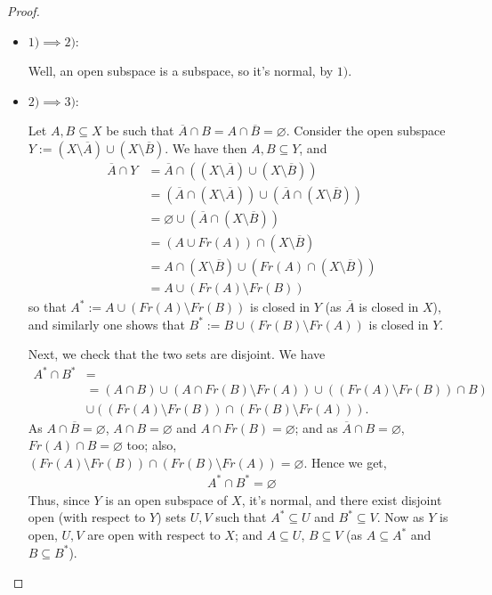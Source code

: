 \documentclass[12pt]{extarticle}
\newcommand{\<}{\langle}
\renewcommand{\>}{\rangle}
\renewcommand{\emptyset}{\varnothing}
\theoremstyle{definition}
\begin{document}
\begin{proof}
  \begin{itemize}
  \item $1) \implies 2)$:

    Well, an open subspace is a subspace, so it's normal, by $1)$.
  \item $2) \implies 3)$:

    Let $A, B \subseteq X$ be such that $\overline{A} \cap B = A \cap \overline{B} = \emptyset$. Consider the open subspace $Y := (X \setminus \overline{A}) \cup (X \setminus \overline{B})$. We have then $A,B \subseteq Y$, and
    \begin{align*}
      \overline{A} \cap Y &= \overline{A} \cap ((X \setminus \overline{A}) \cup (X \setminus \overline{B})) \\ 
      &= (\overline{A} \cap (X \setminus \overline{A})) \cup (\overline{A} \cap (X \setminus \overline{B})) \\
      &= \emptyset \cup (\overline{A} \cap (X \setminus \overline{B})) \\
      &= (A \cup Fr(A)) \cap (X \setminus \overline{B}) \\
      &= A \cap (X \setminus \overline{B}) \cup (Fr(A) \cap (X \setminus \overline{B})) \\
      &= A \cup (Fr(A) \setminus Fr(B))
    \end{align*}
    so that $A^{*} := A \cup (Fr(A) \setminus Fr(B))$ is closed in $Y$ (as $\overline{A}$ is closed in $X$), and similarly one shows that $B^{*} := B \cup (Fr(B) \setminus Fr(A))$ is closed in $Y$.

    Next, we check that the two sets are disjoint. We have
    \begin{align*}
      A^{*} \cap B^{*} &= \\
      &= (A \cap B) \cup (A \cap Fr(B) \setminus Fr(A)) \cup ((Fr(A) \setminus Fr(B)) \cap B) \\
      &\cup ((Fr(A) \setminus Fr(B)) \cap (Fr(B) \setminus Fr(A))).
    \end{align*}
    As $A \cap \overline{B} = \emptyset$, $A \cap B = \emptyset$ and $A \cap Fr(B) = \emptyset$; and as $\overline{A} \cap B = \emptyset$, $Fr(A) \cap B = \emptyset$ too; also,
    $(Fr(A) \setminus Fr(B)) \cap (Fr(B) \setminus Fr(A)) = \emptyset$. Hence we get,
    \begin{align*}
      A^{*} \cap B^{*} = \emptyset
    \end{align*}
    Thus, since $Y$ is an open subspace of $X$, it's normal, and there exist disjoint open (with respect to $Y$) sets $U,V$ such that
    $A^{*} \subseteq U$ and $B^{*} \subseteq V$. Now as $Y$ is open, $U, V$ are open with respect to $X$; and $A \subseteq U$, $B \subseteq V$ (as $A \subseteq A^{*}$ and $B \subseteq B^{*}$).


\end{itemize}
\end{proof}
\end{document}

